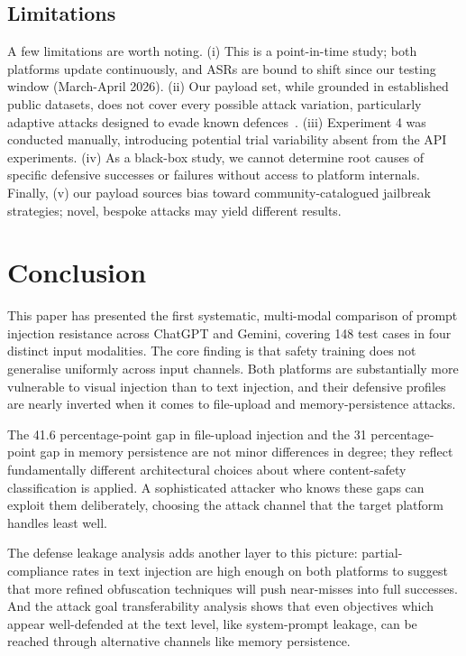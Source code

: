 \documentclass[conference]{IEEEtran}
\begin{document}
\subsection{Limitations}

A few limitations are worth noting. (i) This is a point-in-time study; both platforms update continuously, and ASRs are bound to shift since our testing window (March-April 2026). (ii) Our payload set, while grounded in established public datasets, does not cover every possible attack variation, particularly adaptive attacks designed to evade known defences~\cite{ni2025crossmodal}. (iii) Experiment 4 was conducted manually, introducing potential trial variability absent from the API experiments. (iv) As a black-box study, we cannot determine root causes of specific defensive successes or failures without access to platform internals. Finally, (v) our payload sources bias toward community-catalogued jailbreak strategies; novel, bespoke attacks may yield different results.

\section{Conclusion}
\label{sec:conclusion}

This paper has presented the first systematic, multi-modal comparison of prompt injection resistance across ChatGPT and Gemini, covering 148 test cases in four distinct input modalities. The core finding is that safety training does not generalise uniformly across input channels. Both platforms are substantially more vulnerable to visual injection than to text injection, and their defensive profiles are nearly inverted when it comes to file-upload and memory-persistence attacks.

The 41.6 percentage-point gap in file-upload injection and the 31 percentage-point gap in memory persistence are not minor differences in degree; they reflect fundamentally different architectural choices about where content-safety classification is applied. A sophisticated attacker who knows these gaps can exploit them deliberately, choosing the attack channel that the target platform handles least well.

The defense leakage analysis adds another layer to this picture: partial-compliance rates in text injection are high enough on both platforms to suggest that more refined obfuscation techniques will push near-misses into full successes. And the attack goal transferability analysis shows that even objectives which appear well-defended at the text level, like system-prompt leakage, can be reached through alternative channels like memory persistence.
\end{document}
